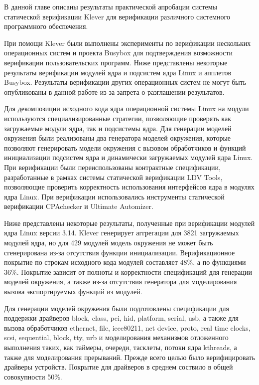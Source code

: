 \documentclass[%
candidate,     %
href,        %
colorlinks,  %
]{disser}
\begin{document}

В данной главе описаны результаты практической апробации системы статической верификации Klever для верификации различного системного программного обеспечения.

При помощи Klever были выполнены эксперименты по верификации нескольких операционных систем и проекта Busybox для подтверждения возможности верификации пользовательских программ.
Ниже представлены некоторые результаты верификации модулей ядра и подсистем ядра Linux и апплетов Busybox.
Результаты верификации других операционных систем не могут быть опубликованы в данной работе из-за запрета о разглашении результатов.

Для декомпозиции исходного кода ядра операционной системы Linux на модули используются специализированные стратегии, позволяющие проверять как загружаемые модули ядра, так и подсистемы ядра.
Для генерации моделей окружения были реализованы два генератора моделей окружения, которые позволяют генерировать модели окружения с вызовом обработчиков и функций инициализации подсистем ядра и динамически загружаемых модулей ядра Linux.
При верификации были переиспользованы контрактные спецификации, разработанные в рамках системы статической верификации LDV Tools, позволяющие проверить корректность использования интерфейсов ядра в модулях ядра Linux.
При верификации использовались инструменты статической верификации CPAchecker и Ultimate Automizer.

Ниже представлены некоторые результаты, полученные при верификации модулей ядра Linux версии 3.14.
Klever генерирует аггрегации для 3821 загружаемых модулей ядра, но для 429 модулей модель окружения не может быть сгенерирована из-за отсутствия функции инициализации.
Верификационное покрытие по строкам исходного кода модулей составляет 48\%, а по функциями 36\%.
Покрытие зависит от полноты и корректности спецификаций для генерации моделей окружения, а также из-за отсутствия генератора для моделирования вызова экспортируемых функций из модулей.

Для генерации моделей окружения были подготовлены спецификации для поддержки драйверов block, class, pci, hid, platform, serial, usb, а также для вызова обработчиков ethernet, file, ieee80211, net device, proto, real time clocks, scsi, sequential, block, tty, urb и моделирования механизмов отложенного выполнения таких, как таймеры, очереди, тасклеты, потоки ядра kthreads, а также для моделирования прерываний.
Прежде всего целью было верифицировать драйверы устройств.
Покрытие для драйверов в среднем соствило в общей совокупности 50\%.
\end{document}
